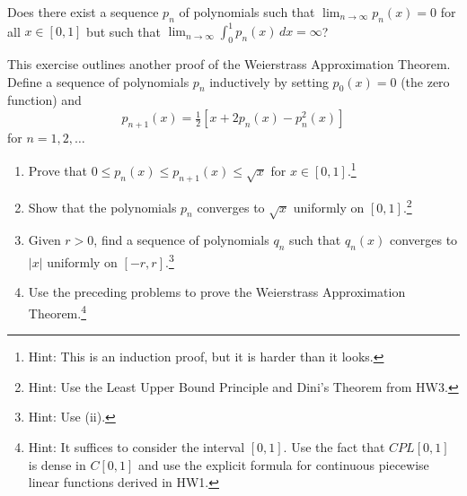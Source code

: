 \documentclass{../homework}
\begin{document}
\begin{Exercise}
	Does there exist a sequence $p_n$ of polynomials such that
  $\lim_{n\to\infty} p_n(x) = 0$ for all $x\in [0,1]$ but such that
  $\lim_{n\to\infty} \int_0^1 p_n(x)\,dx = \infty$?

  \begin{solution}

  \end{solution}
\end{Exercise}

\begin{Exercise}
	This exercise outlines another proof of the Weierstrass
  Approximation Theorem.  Define a sequence of polynomials $p_n$
  inductively by setting $p_0(x) = 0$ (the zero function) and
	\begin{equation*}
		p_{n+1}(x) = \tfrac{1}{2}[x + 2p_n(x) -  p_n^2(x)]
	\end{equation*}
	for $n = 1,2,\ldots$

	\begin{enumerate}
  \item Prove that $0 \leq p_n(x) \leq p_{n+1}(x) \leq \sqrt{x}$ for
    $x \in [0,1]$.\footnote{Hint: This is an induction proof, but it
      is harder than it looks.}

    \begin{solution}

    \end{solution}

  \item Show that the polynomials $p_n$ converges to $\sqrt{x}$
    uniformly on $[0,1]$.\footnote{Hint: Use the Least Upper Bound
      Principle and Dini's Theorem from HW3.}

    \begin{solution}

    \end{solution}

  \item Given $r>0$, find a sequence of polynomials $q_n$ such that
    $q_n(x)$ converges to $|x|$ uniformly on $[-r,r]$.\footnote{Hint:
      Use (ii).}

    \begin{solution}

    \end{solution}

  \item Use the preceding problems to prove the Weierstrass
    Approximation Theorem.\footnote{Hint: It suffices to consider the
      interval $[0,1]$.  Use the fact that $CPL[0,1]$ is dense in
      $C[0,1]$ and use the explicit formula for continuous piecewise
      linear functions derived in HW1.}

    \begin{solution}

    \end{solution}
	\end{enumerate}
\end{Exercise}
\end{document}
